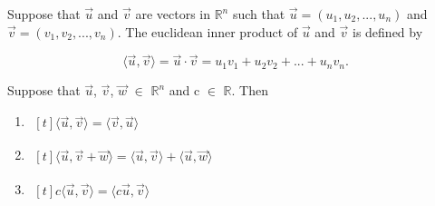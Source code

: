 \documentclass[../../main.tex]{subfiles}
\begin{document}
\begin{defn}
Suppose that $\vec{u}$ and $\vec{v}$ are vectors in $\mathbb{R}^n$ such that $\vec{u} = (u_1,u_2,...,u_n)$ and $\vec{v} = (v_1,v_2,...,v_n)$. The euclidean inner product of $\vec{u}$ and $\vec{v}$ is defined by 

\begin{equation*}
  \langle \vec{u},\vec{v} \rangle = \vec{u} \cdot \vec{v} = u_1v_1 + u_2v_2 +...+ u_nv_n.
\end{equation*}
\end{defn}

\begin{prop}
Suppose that $\vec{u}$, $\vec{v}$, $\vec{w}$ ${\in}$ $\mathbb{R}^n$ and c ${\in}$ $\mathbb{R}$. Then 

\begin{enumerate}
    \item $
    \!
    \begin{aligned}[t]
    \langle \vec{u},\vec{v} \rangle = \langle \vec{v},\vec{u} \rangle
    \end{aligned}
    $
    \item $
    \!
    \begin{aligned}[t]
    \langle \vec{u},\vec{v}+\vec{w} \rangle = \langle \vec{u},\vec{v} \rangle + \langle \vec{u},\vec{w} \rangle
    \end{aligned}
    $
    \item $
    \!
    \begin{aligned}[t]
    c\langle \vec{u},\vec{v} \rangle = \langle c\vec{u},\vec{v} \rangle
    \end{aligned}
    $
\end{enumerate}
\end{prop}
\end{document}
